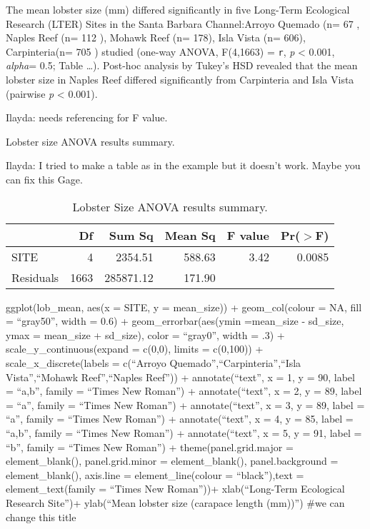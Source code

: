 \documentclass[]{article}
\begin{document}
The mean lobster size (mm) differed significantly in five Long-Term
Ecological Research (LTER) Sites in the Santa Barbara Channel:Arroyo
Quemado (n= 67 , Naples Reef (n= 112 ), Mohawk Reef (n= 178), Isla Vista
(n= 606), Carpinteria(n= 705 ) studied (one-way ANOVA, F(4,1663) =
\texttt{r}, \emph{p} \textless{} 0.001, \emph{alpha}= 0.5; Table
\ldots{}). Post-hoc analysis by Tukey's HSD revealed that the mean
lobster size in Naples Reef differed significantly from Carpinteria and
Isla Vista (pairwise \emph{p} \textless{} 0.001).

Ilayda: needs referencing for F value.

Lobster size ANOVA results summary.

Ilayda: I tried to make a table as in the example but it doesn't work.
Maybe you can fix this Gage.

\begin{table}[ht]
\centering
\caption{Lobster Size ANOVA results summary.} 
\begin{tabular}{lrrrrr}
  \hline
 & Df & Sum Sq & Mean Sq & F value & Pr($>$F) \\ 
  \hline
SITE & 4 & 2354.51 & 588.63 & 3.42 & 0.0085 \\ 
  Residuals & 1663 & 285871.12 & 171.90 &  &  \\ 
   \hline
\end{tabular}
\end{table}

ggplot(lob\_mean, aes(x = SITE, y = mean\_size)) + geom\_col(colour =
NA, fill = ``gray50'', width = 0.6) + geom\_errorbar(aes(ymin
=mean\_size - sd\_size, ymax = mean\_size + sd\_size), color =
``gray0'', width = .3) + scale\_y\_continuous(expand = c(0,0), limits =
c(0,100)) + scale\_x\_discrete(labels = c(``Arroyo
Quemado'',``Carpinteria'',``Isla Vista'',``Mohawk Reef'',``Naples
Reef'')) + annotate(``text'', x = 1, y = 90, label = ``a,b'', family =
``Times New Roman'') + annotate(``text'', x = 2, y = 89, label = ``a'',
family = ``Times New Roman'') + annotate(``text'', x = 3, y = 89, label
= ``a'', family = ``Times New Roman'') + annotate(``text'', x = 4, y =
85, label = ``a,b'', family = ``Times New Roman'') + annotate(``text'',
x = 5, y = 91, label = ``b'', family = ``Times New Roman'') +
theme(panel.grid.major = element\_blank(), panel.grid.minor =
element\_blank(), panel.background = element\_blank(), axis.line =
element\_line(colour = ``black''),text = element\_text(family = ``Times
New Roman''))+ xlab(``\n Long-Term Ecological Research Site'')+
ylab(``Mean lobster size (carapace length (mm))'') \#we can change this
title
\end{document}
